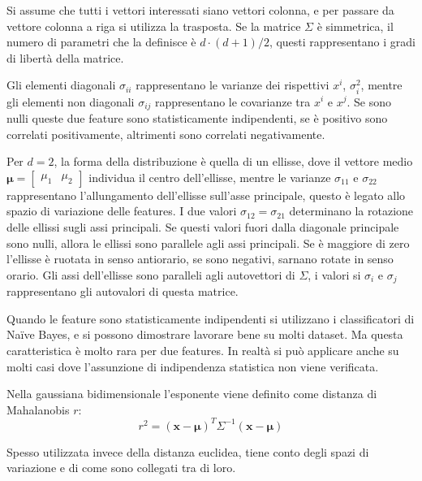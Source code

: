 \documentclass{article}
\numberwithin{equation}{subsection}
\newcommand{\vect}[1]{\boldsymbol{\mathbf{#1}}}
\begin{document}
Si assume che tutti i vettori interessati siano vettori colonna, e per passare da vettore colonna a riga si utilizza la trasposta. Se la matrice $\Sigma$ è simmetrica, il numero di 
parametri che la definisce è $d\cdot(d+1)/2$, questi rappresentano i gradi di libertà della matrice. 

Gli elementi diagonali $\sigma_{ii}$ rappresentano le varianze dei rispettivi $x^i$, $\sigma_i^2$, mentre gli elementi non diagonali $\sigma_{ij}$ rappresentano le covarianze tra $x^i$ e $x^j$. Se sono nulli queste due feature sono statisticamente indipendenti, se è positivo sono correlati positivamente, altrimenti sono correlati negativamente. 

Per $d=2$, la forma della distribuzione è quella di un ellisse, dove il vettore medio $\vect{\mu}=\begin{bmatrix}\mu_1&\mu_2\end{bmatrix}$ individua il centro dell'ellisse, mentre le varianze $\sigma_{11}$ e $\sigma_{22}$ rappresentano l'allungamento dell'ellisse sull'asse 
principale, questo è legato allo spazio di variazione delle features. 
I due valori $\sigma_{12}=\sigma_{21}$ determinano la rotazione delle ellissi sugli assi principali. Se questi valori fuori dalla diagonale principale sono nulli, allora le ellissi sono parallele agli assi principali. Se è maggiore di zero l'ellisse è ruotata in senso antiorario, se sono negativi, sarnano rotate in senso orario. 
Gli assi dell'ellisse sono paralleli agli autovettori di $\Sigma$, i valori si $\sigma_i$ e $\sigma_j$ rappresentano gli autovalori di questa matrice. 


Quando le feature sono statisticamente indipendenti si utilizzano i classificatori di Na\"{i}ve Bayes, e si possono dimostrare lavorare bene su molti dataset. Ma questa caratteristica è molto rara per due features. In realtà si può applicare anche su molti casi dove l'assunzione di indipendenza statistica non viene verificata. 

Nella gaussiana bidimensionale l'esponente viene definito come distanza di Mahalanobis $r$:
\begin{equation}
    r^2={(\vect{x}-\vect{\mu})^T\Sigma^{-1}(\vect{x}-\vect{\mu})}
\end{equation}

Spesso utilizzata invece della distanza euclidea, tiene conto degli spazi di variazione e di come sono collegati tra di loro. 
\end{document}
